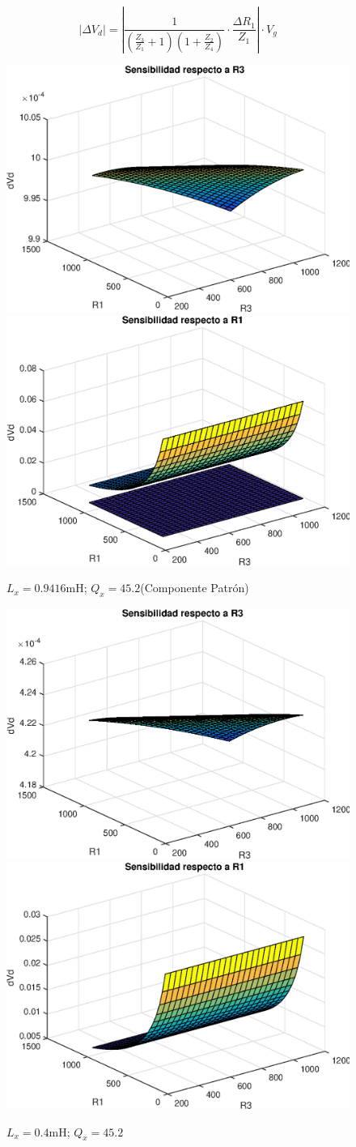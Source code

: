     \begin{equation}
        |\Delta V_d| = \left| \frac{1}{(\frac{Z_3}{Z_1}+1)(1+\frac{Z_2}{Z_4})} \cdot \frac{\Delta R_1}{Z_1} \right| \cdot V_g
        \label{eq:ej3dVdR1}
    \end{equation}

    \begin{figure}[ht!]
        \begin{center}
            \includegraphics[width=0.4\linewidth]{MATLAB/ej3dVd3}
            \includegraphics[width=0.4\linewidth]{MATLAB/ej3dVd1}
            \caption{$L_x=0.9416\si{\milli\henry}$; $Q_x=45.2$(Componente Patrón)}
            \label{fig:ej3dVd:patron}
        \end{center}
    \end{figure}

    \begin{figure}[ht!]
        \begin{center}
            \includegraphics[width=0.4\linewidth]{MATLAB/ej3dVd3min}
            \includegraphics[width=0.4\linewidth]{MATLAB/ej3dVd1min}
            \caption{$L_x=0.4\si{\milli\henry}$; $Q_x=45.2$}
            \label{fig:ej3dVd:min}
        \end{center}
    \end{figure}


